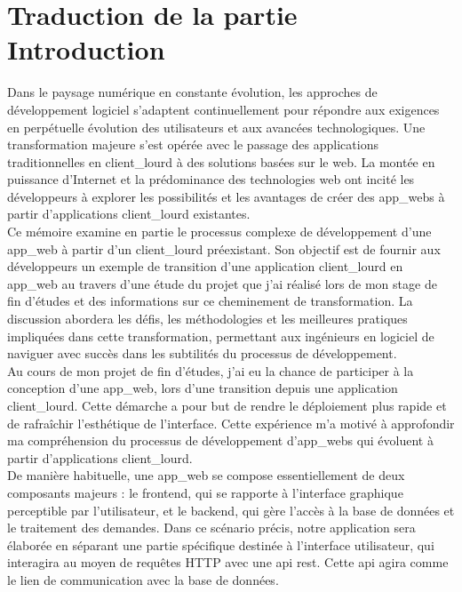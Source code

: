 \documentclass[a4paper, 12pt, french]{article}
\begin{document}
		\localtableofcontents

		\newpage

		\section{Traduction de la partie Introduction}\label{appendix:introduction_translation}
			Dans le paysage numérique en constante évolution, les approches de développement logiciel s'adaptent continuellement pour répondre aux exigences en perpétuelle évolution des utilisateurs et aux avancées technologiques. Une transformation majeure s'est opérée avec le passage des applications traditionnelles en \gls{client_lourd} à des solutions basées sur le web. La montée en puissance d'Internet et la prédominance des technologies web ont incité les développeurs à explorer les possibilités et les avantages de créer des \glspl{app_web} à partir d'applications \gls{client_lourd} existantes.\\

			Ce mémoire examine en partie le processus complexe de développement d'une \gls{app_web} à partir d'un \gls{client_lourd} préexistant. Son objectif est de fournir aux développeurs un exemple de transition d'une application \gls{client_lourd} en \gls{app_web} au travers d'une étude du projet que j'ai réalisé lors de mon stage de fin d'études et des informations sur ce cheminement de transformation. La discussion abordera les défis, les méthodologies et les meilleures pratiques impliquées dans cette transformation, permettant aux ingénieurs en logiciel de naviguer avec succès dans les subtilités du processus de développement.\\
	
			Au cours de mon projet de fin d'études, j'ai eu la chance de participer à la conception d'une \gls{app_web}, lors d'une transition depuis une application \gls{client_lourd}. Cette démarche a pour but de rendre le déploiement plus rapide et de rafraîchir l'esthétique de l'interface. Cette expérience m'a motivé à approfondir ma compréhension du processus de développement d'\glspl{app_web} qui évoluent à partir d'applications \gls{client_lourd}.\\
			
			De manière habituelle, une \gls{app_web} se compose essentiellement de deux composants majeurs : le \gls{frontend}, qui se rapporte à l'interface graphique perceptible par l'utilisateur, et le \gls{backend}, qui gère l'accès à la base de données et le traitement des demandes. Dans ce scénario précis, notre application sera élaborée en séparant une partie spécifique destinée à l'interface utilisateur, qui interagira au moyen de requêtes HTTP avec une \acrshort{api} \acrshort{rest}. Cette \acrshort{api} agira comme le lien de communication avec la base de données.\\
			
\end{document}
